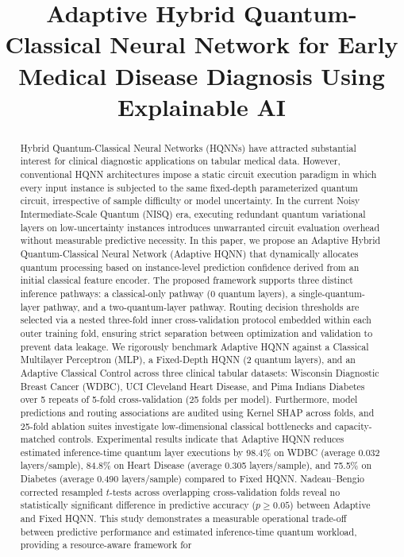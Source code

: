 \documentclass[conference]{IEEEtran}
\begin{document}
\title{Adaptive Hybrid Quantum-Classical Neural Network for Early Medical Disease Diagnosis Using Explainable AI}

\author{
}

\maketitle

\begin{abstract}
Hybrid Quantum-Classical Neural Networks (HQNNs) have attracted substantial interest for clinical diagnostic applications on tabular medical data. However, conventional HQNN architectures impose a static circuit execution paradigm in which every input instance is subjected to the same fixed-depth parameterized quantum circuit, irrespective of sample difficulty or model uncertainty. In the current Noisy Intermediate-Scale Quantum (NISQ) era, executing redundant quantum variational layers on low-uncertainty instances introduces unwarranted circuit evaluation overhead without measurable predictive necessity. In this paper, we propose an Adaptive Hybrid Quantum-Classical Neural Network (Adaptive HQNN) that dynamically allocates quantum processing based on instance-level prediction confidence derived from an initial classical feature encoder. The proposed framework supports three distinct inference pathways: a classical-only pathway (0 quantum layers), a single-quantum-layer pathway, and a two-quantum-layer pathway. Routing decision thresholds are selected via a nested three-fold inner cross-validation protocol embedded within each outer training fold, ensuring strict separation between optimization and validation to prevent data leakage. We rigorously benchmark Adaptive HQNN against a Classical Multilayer Perceptron (MLP), a Fixed-Depth HQNN (2 quantum layers), and an Adaptive Classical Control across three clinical tabular datasets: Wisconsin Diagnostic Breast Cancer (WDBC), UCI Cleveland Heart Disease, and Pima Indians Diabetes over 5 repeats of 5-fold cross-validation (25 folds per model). Furthermore, model predictions and routing associations are audited using Kernel SHAP across folds, and 25-fold ablation suites investigate low-dimensional classical bottlenecks and capacity-matched controls. Experimental results indicate that Adaptive HQNN reduces estimated inference-time quantum layer executions by 98.4\% on WDBC (average 0.032 layers/sample), 84.8\% on Heart Disease (average 0.305 layers/sample), and 75.5\% on Diabetes (average 0.490 layers/sample) compared to Fixed HQNN. Nadeau--Bengio corrected resampled $t$-tests across overlapping cross-validation folds reveal no statistically significant difference in predictive accuracy ($p \ge 0.05$) between Adaptive and Fixed HQNN. This study demonstrates a measurable operational trade-off between predictive performance and estimated inference-time quantum workload, providing a resource-aware framework for 
\end{abstract}
\end{document}
